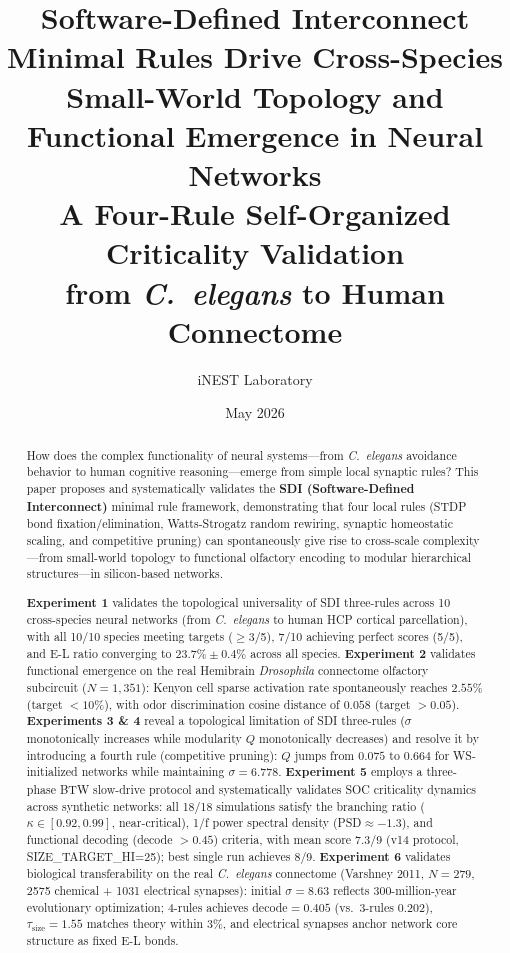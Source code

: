 \documentclass[12pt,a4paper]{article}
\title{\textbf{Software-Defined Interconnect Minimal Rules Drive Cross-Species Small-World Topology and Functional Emergence in Neural Networks}\\[0.5em]
\large A Four-Rule Self-Organized Criticality Validation\\
from \textit{C.\ elegans} to Human Connectome}
\author[1]{iNEST Laboratory}
\affil[1]{iNEST Research Group, Department of Neuromorphic Computing}
\date{May 2026}
\begin{document}
\maketitle

\begin{abstract}
How does the complex functionality of neural systems---from \textit{C.\ elegans} avoidance behavior to human cognitive reasoning---emerge from simple local synaptic rules? This paper proposes and systematically validates the \textbf{SDI (Software-Defined Interconnect)} minimal rule framework, demonstrating that four local rules (STDP bond fixation/elimination, Watts-Strogatz random rewiring, synaptic homeostatic scaling, and competitive pruning) can spontaneously give rise to cross-scale complexity---from small-world topology to functional olfactory encoding to modular hierarchical structures---in silicon-based networks.

\textbf{Experiment 1} validates the topological universality of SDI three-rules across 10 cross-species neural networks (from \textit{C.\ elegans} to human HCP cortical parcellation), with all 10/10 species meeting targets ($\geq$3/5), 7/10 achieving perfect scores (5/5), and E-L ratio converging to $23.7\%\pm 0.4\%$ across all species. \textbf{Experiment 2} validates functional emergence on the real Hemibrain \textit{Drosophila} connectome olfactory subcircuit ($N=1{,}351$): Kenyon cell sparse activation rate spontaneously reaches $2.55\%$ (target $<10\%$), with odor discrimination cosine distance of $0.058$ (target $>0.05$). \textbf{Experiments 3 \& 4} reveal a topological limitation of SDI three-rules ($\sigma$ monotonically increases while modularity $Q$ monotonically decreases) and resolve it by introducing a fourth rule (competitive pruning): $Q$ jumps from $0.075$ to $0.664$ for WS-initialized networks while maintaining $\sigma=6.778$. \textbf{Experiment 5} employs a three-phase BTW slow-drive protocol and systematically validates SOC criticality dynamics across synthetic networks: all 18/18 simulations satisfy the branching ratio ($\kappa\in[0.92, 0.99]$, near-critical), 1/f power spectral density (PSD$\approx -1.3$), and functional decoding (decode $>0.45$) criteria, with mean score 7.3/9 (v14 protocol, SIZE\_TARGET\_HI=25); best single run achieves 8/9. \textbf{Experiment 6} validates biological transferability on the real \textit{C.\ elegans} connectome (Varshney 2011, $N=279$, 2575 chemical + 1031 electrical synapses): initial $\sigma=8.63$ reflects 300-million-year evolutionary optimization; 4-rules achieves decode$=0.405$ (vs.\ 3-rules $0.202$), $\tau_{\text{size}}=1.55$ matches theory within 3\%, and electrical synapses anchor network core structure as fixed E-L bonds.


\end{abstract}
\end{document}
